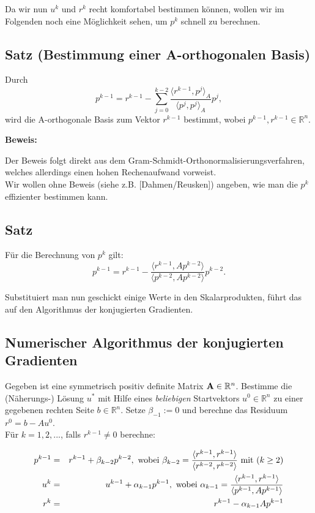 Da wir nun $u^{k}$ und $r^{k}$ recht komfortabel bestimmen können, wollen wir im Folgenden noch eine Möglichkeit sehen, um $p^{k}$ schnell zu berechnen.

\subsection{Satz (Bestimmung einer A-orthogonalen Basis)}
Durch
\begin{equation}
p^{k-1} = r^{k-1} - \sum_{j=0}^{k-2} \frac {\langle r^{k-1}, p^{j} \rangle _{A}} {\langle p^{j}, p^{j} \rangle _{A}} p^{j},
\end{equation}
wird die A-orthogonale Basis zum Vektor $r^{k-1}$ bestimmt, wobei $p^{k-1},r^{k-1} \in \mathbb{R}^{n}$.

\textbf{Beweis:}

Der Beweis folgt direkt aus dem Gram-Schmidt-Orthonormalisierungsverfahren, welches allerdings einen hohen Rechenaufwand vorweist.\\
Wir wollen ohne Beweis (siehe z.B. [Dahmen/Reusken]) angeben, wie man die $p^{k}$ effizienter bestimmen kann.

\subsection{Satz}
Für die Berechnung von $p^{k}$ gilt:
\begin{equation}
p^{k-1} = r^{k-1} - \frac {\langle r^{k-1}, Ap^{k-2} \rangle} {\langle p^{k-2}, Ap^{k-2} \rangle} p^{k-2}.
\end{equation}

Substituiert man nun geschickt einige Werte in den Skalarprodukten, führt das auf den Algorithmus der konjugierten Gradienten.

\subsection{Numerischer Algorithmus der konjugierten Gradienten}\label{ss.Numerisches CG}

Gegeben ist eine symmetrisch positiv definite Matrix ${\textbf{A}} \in \mathbb{R}^{n}$. Bestimme die (Näherungs-) Lösung $u^{*}$ mit Hilfe eines \textit{beliebigen} Startvektors $u^{0} \in \mathbb{R}^{n}$ zu einer gegebenen rechten Seite $b \in \mathbb{R}^{n}$. Setze $\beta_{-1} := 0$ und berechne das Residuum $r^{0} = b - Au^{0}$. \\
Für $k = 1,2,...$, falls $r^{k-1} \ne 0$ berechne:

\begin{eqnarray}
p^{k-1} &=& r^{k-1} + \beta_{k-2}p^{k-2}, \textnormal{ wobei } \beta_{k-2} = \frac {\langle r^{k-1}, r^{k-1} \rangle} {\langle r^{k-2}, r^{k-2} \rangle} \textnormal{ mit } (k \ge 2) \notag \\
u^{k} &=& u^{k-1} + \alpha_{k-1}p^{k-1}, \textnormal{ wobei } \alpha_{k-1} = \frac {\langle r^{k-1}, r^{k-1} \rangle} {\langle p^{k-1}, Ap^{k-1} \rangle} \notag \\
r^{k} &=& r^{k-1} - \alpha_{k-1}Ap^{k-1} \notag
\end{eqnarray}

